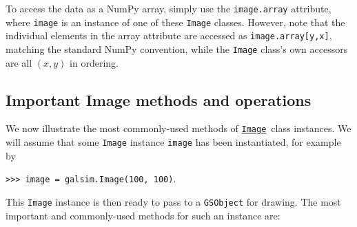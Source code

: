 \documentclass[preprint,10pt]{../../devel/modules/aastex}
\newcommand\Image{\href{http://galsim-developers.github.io/GalSim/classgalsim_1_1image_1_1_image.html}{\texttt{Image}}}
\begin{document}
To access the data as a NumPy array, simply use the \texttt{image.array}
attribute, where \texttt{image} is an instance of one of these
\texttt{Image} classes.  However, note that the individual elements in
the array attribute are accessed as \texttt{image.array[y,x]}, matching
the standard NumPy convention, while the \texttt{Image} class's own
accessors are all $(x,y)$ in ordering.

\subsection{Important Image methods and operations}\label{sect:imagemethods}
We now illustrate the most commonly-used methods of \Image\
class instances.  We will assume that some \texttt{Image} instance
\texttt{image} has been instantiated, for example by

\texttt{>>> image = galsim.Image(100, 100)}.

This \texttt{Image} instance is then ready to pass to a
\texttt{GSObject} for drawing.  The most important and commonly-used
methods for such an instance are:
\end{document}
